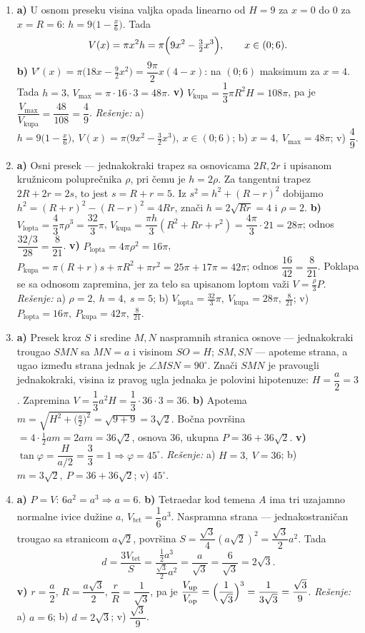 \begin{enumerate}[label=\arabic*.]
\item \textbf{a)} U osnom preseku visina valjka opada linearno od $H=9$ za $x=0$ do $0$ za $x=R=6$: $h=9\bigl(1-\tfrac{x}{6}\bigr)$. Tada
\[V(x)=\pi x^2 h=\pi\Bigl(9x^2-\tfrac{3}{2}x^3\Bigr),\qquad x\in(0;6).\]
\textbf{b)} $V'(x)=\pi\bigl(18x-\tfrac{9}{2}x^2\bigr)=\dfrac{9\pi}{2}x(4-x)$: na $(0;6)$ maksimum za $x=4$. Tada $h=3$, $V_{\max}=\pi\cdot16\cdot3=48\pi$.
\textbf{v)} $V_{\text{kupa}}=\dfrac{1}{3}\pi R^2H=108\pi$, pa je $\dfrac{V_{\max}}{V_{\text{kupa}}}=\dfrac{48}{108}=\dfrac{4}{9}$.
\emph{Rešenje:} a) $h=9\bigl(1-\tfrac{x}{6}\bigr),\ V(x)=\pi\bigl(9x^2-\tfrac32x^3\bigr),\ x\in(0;6)$; b) $x=4,\ V_{\max}=48\pi$; v) $\dfrac49$.

\item \textbf{a)} Osni presek — jednakokraki trapez sa osnovicama $2R,2r$ i upisanom kružnicom poluprečnika $\rho$, pri čemu je $h=2\rho$. Za tangentni trapez $2R+2r=2s$, to jest $s=R+r=5$. Iz $s^2=h^2+(R-r)^2$ dobijamo $h^2=(R+r)^2-(R-r)^2=4Rr$, znači $h=2\sqrt{Rr}=4$ i $\rho=2$.
\textbf{b)} $V_{\text{lopta}}=\dfrac{4}{3}\pi\rho^3=\dfrac{32}{3}\pi$, $V_{\text{kupa}}=\dfrac{\pi h}{3}(R^2+Rr+r^2)=\dfrac{4\pi}{3}\cdot21=28\pi$; odnos $\dfrac{32/3}{28}=\dfrac{8}{21}$.
\textbf{v)} $P_{\text{lopta}}=4\pi\rho^2=16\pi$, $P_{\text{kupa}}=\pi(R+r)s+\pi R^2+\pi r^2=25\pi+17\pi=42\pi$; odnos $\dfrac{16}{42}=\dfrac{8}{21}$. Poklapa se sa odnosom zapremina, jer za telo sa upisanom loptom važi $V=\tfrac{\rho}{3}P$.
\emph{Rešenje:} a) $\rho=2,\ h=4,\ s=5$; b) $V_{\text{lopta}}=\tfrac{32}{3}\pi,\ V_{\text{kupa}}=28\pi,\ \tfrac{8}{21}$; v) $P_{\text{lopta}}=16\pi,\ P_{\text{kupa}}=42\pi,\ \tfrac{8}{21}$.

\item \textbf{a)} Presek kroz $S$ i sredine $M,N$ naspramnih stranica osnove — jednakokraki trougao $SMN$ sa $MN=a$ i visinom $SO=H$; $SM,SN$ — apoteme strana, a ugao između strana jednak je $\angle MSN=90^\circ$. Znači $SMN$ je pravougli jednakokraki, visina iz pravog ugla jednaka je polovini hipotenuze: $H=\dfrac{a}{2}=3$. Zapremina $V=\dfrac{1}{3}a^2H=\dfrac{1}{3}\cdot36\cdot3=36$.
\textbf{b)} Apotema $m=\sqrt{H^2+\bigl(\tfrac{a}{2}\bigr)^2}=\sqrt{9+9}=3\sqrt2$. Bočna površina $=4\cdot\tfrac12 a m=2am=36\sqrt2$, osnova $36$, ukupna $P=36+36\sqrt2$.
\textbf{v)} $\tan\varphi=\dfrac{H}{a/2}=\dfrac{3}{3}=1\Rightarrow\varphi=45^\circ$.
\emph{Rešenje:} a) $H=3,\ V=36$; b) $m=3\sqrt2,\ P=36+36\sqrt2$; v) $45^\circ$.

\item \textbf{a)} $P=V$: $6a^2=a^3\Rightarrow a=6$.
\textbf{b)} Tetraedar kod temena $A$ ima tri uzajamno normalne ivice dužine $a$, $V_{\text{tet}}=\dfrac{1}{6}a^3$. Naspramna strana — jednakostraničan trougao sa stranicom $a\sqrt2$, površina $S=\dfrac{\sqrt3}{4}(a\sqrt2)^2=\dfrac{\sqrt3}{2}a^2$. Tada
\[d=\frac{3V_{\text{tet}}}{S}=\frac{\tfrac12 a^3}{\tfrac{\sqrt3}{2}a^2}=\frac{a}{\sqrt3}=\frac{6}{\sqrt3}=2\sqrt3.\]
\textbf{v)} $r=\dfrac{a}{2}$, $R=\dfrac{a\sqrt3}{2}$, $\dfrac{r}{R}=\dfrac{1}{\sqrt3}$, pa je $\dfrac{V_{\text{up}}}{V_{\text{op}}}=\Bigl(\dfrac{1}{\sqrt3}\Bigr)^3=\dfrac{1}{3\sqrt3}=\dfrac{\sqrt3}{9}$.
\emph{Rešenje:} a) $a=6$; b) $d=2\sqrt3$; v) $\dfrac{\sqrt3}{9}$.
\end{enumerate}
\clearpage
